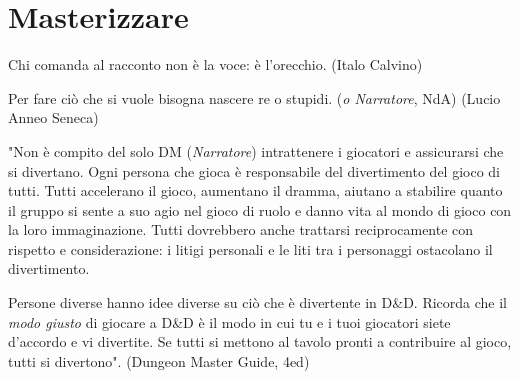 \section{Masterizzare}

\label{masterizzare}

\begin{changemargin}{0.3cm}{0.3cm}\begin{enfasi}{
Chi comanda al racconto non è la voce: è l'orecchio. (Italo Calvino)

\medskip

Per fare ciò che si vuole bisogna nascere re o stupidi. (\emph{o Narratore}, NdA) (Lucio Anneo Seneca)

\medskip



"Non è compito del solo DM (\emph{Narratore}) intrattenere i giocatori e assicurarsi che si divertano. Ogni persona che gioca è responsabile del divertimento del gioco di tutti. Tutti accelerano il gioco, aumentano il dramma, aiutano a stabilire quanto il gruppo si sente a suo agio nel gioco di ruolo e danno vita al mondo di gioco con la loro immaginazione. Tutti dovrebbero anche trattarsi reciprocamente con rispetto e considerazione: i litigi personali e le liti tra i personaggi ostacolano il divertimento.

Persone diverse hanno idee diverse su ciò che è divertente in D\&D. Ricorda che il \emph{modo giusto} di giocare a D\&D è il modo in cui tu e i tuoi giocatori siete d'accordo e vi divertite. Se tutti si mettono al tavolo pronti a contribuire al gioco, tutti si divertono". (Dungeon Master Guide, 4ed)

}\end{enfasi}\end{changemargin}\medskip

